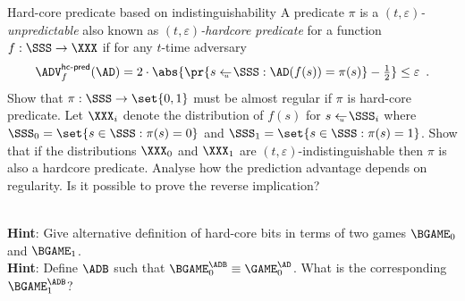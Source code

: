 \documentclass{crypto-exercise}
\author{Sven Laur}
\begin{document}
\begin{exercise}{Hard-core predicate based on indistinguishability}
A predicate $\pi$ is a \emph{$(t,\varepsilon)$-unpredictable} also known as \emph{$(t,\varepsilon)$-hardcore predicate} for a function $f:\SSS\to\XXX$ if for any $t$-time adversary
  \begin{align*}
    \advHCPredXX{f}{\AD}%
    =2\cdot\abs{\pr{s\getsu\SSS:\AD(f(s))=\pi(s)}-{\textstyle\frac{1}{2}}}\leq\varepsilon\enspace.
  \end{align*}
Show that $\pi:\SSS\to\set{0,1}$ must be almost regular if $\pi$ is hard-core predicate. 
Let $\XXX_i$ denote the distribution of $f(s)$ for $s\getsu\SSS_i$ where $\SSS_0=\set{s\in\SSS:\pi(s)=0}$ and $\SSS_1=\set{s\in\SSS:\pi(s)=1}$. 
Show that if the distributions $\XXX_0$ and $\XXX_1$ are $(t,\varepsilon)$-indistinguishable then $\pi$ is also a hardcore predicate. 
Analyse how the prediction advantage depends on regularity. 
Is it possible to prove the reverse implication? 
\end{exercise}
\begin{solution}\ \\
\textbf{Hint}: Give alternative definition of hard-core bits in terms of two games $\BGAME_0$ and $\BGAME_1$.\\
\textbf{Hint}: Define $\ADB$ such that $\BGAME_0^\ADB\equiv \GAME_0^\AD$. What is the corresponding $\BGAME_1^\ADB$?\\
 


\end{solution}
\end{document}
